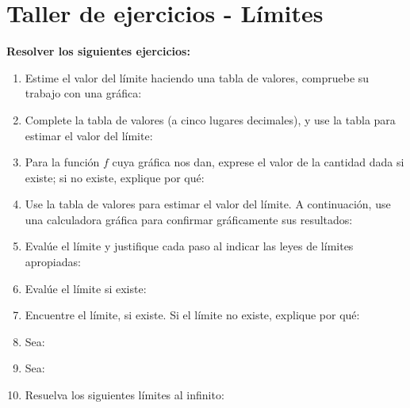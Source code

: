 \documentclass[12pt]{article}
\begin{document}
    

    \section*{\centering Taller de ejercicios - Límites}
        \textbf{Resolver los siguientes ejercicios:}

        \begin{enumerate}
            \item Estime el valor del límite haciendo una tabla de valores, compruebe su trabajo con una gráfica:
            \item Complete la tabla de valores (a cinco lugares decimales), y use la tabla para estimar el valor del límite:
            \item Para la función $f$ cuya gráfica nos dan, exprese el valor de la cantidad dada si existe; si no existe, explique por qué:
            \item Use la tabla de valores para estimar el valor del límite. A continuación, use una calculadora gráfica para confirmar gráficamente sus resultados:
            \item Evalúe el límite y justifique cada paso al indicar las leyes de límites apropiadas:
            \item Evalúe el límite si existe:
            \item Encuentre el límite, si existe. Si el límite no existe, explique por qué:
            \item Sea:
            \item Sea:
            \item Resuelva los siguientes límites al infinito:
        \end{enumerate}
\end{document}
